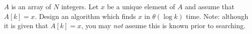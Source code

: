 $A$ is an array of $N$ integers.  Let $x$ be a unique element of $A$ and
assume that $A[k]=x$.  Design an algorithm which finds $x$ in
$\theta  (\log  k)$ time.  Note: although it is given that $A[k]=x$, you may 
{\em not}
assume this is known prior to searching.


